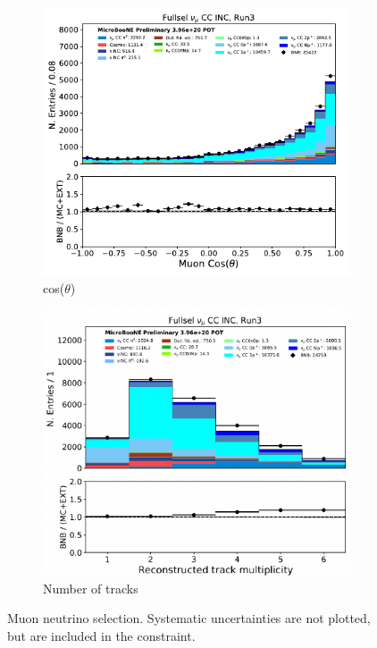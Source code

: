 \begin{figure}[H]
\begin{center}
\begin{subfigure}[b]{0.3\textwidth}
    \includegraphics[width=1.00\textwidth]{Fakedata/set4/numu_costheta.pdf}
    \caption{\label{fig:fakedata:set4:numu_costheta} cos($\theta$)}
    \end{subfigure}
    \begin{subfigure}[b]{0.3\textwidth}
    \centering
    \includegraphics[width=1.00\textwidth]{Fakedata/set4/numu_ntracks.pdf}
    \caption{\label{fig:fakedata:set4:numu_ntracks} Number of tracks}
    \end{subfigure}
\caption{\label{fig:fakedata:set4:numu} Muon neutrino selection. Systematic uncertainties are not plotted, but are included in the constraint.}
\end{center}
\end{figure}

